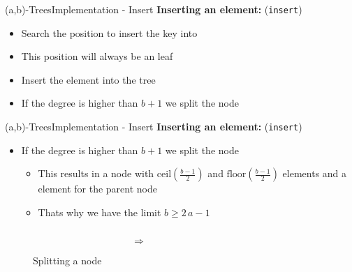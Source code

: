 
\begin{frame}{(a,b)-Trees}{Implementation - Insert}
  \textbf{Inserting an element:} (\texttt{\color{Mittel-Blau}insert})
  \begin{itemize}
    \item<2->
      Search the position to insert the key into
    \item<3->
      This position will always be an leaf
    \item<4->
      Insert the element into the tree
    \item<5->
      If the degree is higher than {\color{Mittel-Blau}$b+1$}
      we split the node
  \end{itemize}
\end{frame}


\begin{frame}{(a,b)-Trees}{Implementation - Insert}
  \textbf{Inserting an element:} (\texttt{\color{Mittel-Blau}insert})
  \begin{itemize}
    \item<2->
      If the degree is higher than {\color{Mittel-Blau}$b+1$}
      we split the node
    \begin{itemize}
      \item<3->
        This results in a node with
        {\color{Mittel-Blau}$\mathrm{ceil}\left(\frac{b-1}{2}\right)$} and
        {\color{Mittel-Blau}$\mathrm{floor}\left(\frac{b-1}{2}\right)$}
        elements and a element for the parent node
      \item<4->
        Thats why we have the limit {\color{Mittel-Blau}$b \geq 2\,a - 1$}
    \end{itemize}
  \end{itemize}
  \begin{figure}
    \begin{columns}
      \begin{column}{0.35\linewidth}
        \begin{adjustbox}{width=\linewidth}
          
        \end{adjustbox}
      \end{column}
      \begin{column}{0.1\linewidth}
        \begin{center}
          $\Rightarrow$
        \end{center}
      \end{column}
      \begin{column}{0.35\linewidth}
        \begin{adjustbox}{width=\linewidth}
          
        \end{adjustbox}
      \end{column}
    \end{columns}
    \caption{Splitting a node}
    \label{fig:a_b_tree:insert_node_split}
  \end{figure}
\end{frame}

